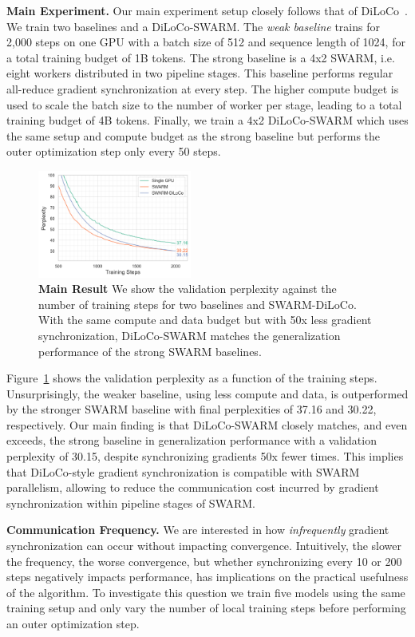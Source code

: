 \documentclass[conference, 10pt]{IEEEtran}
\begin{document}
\textbf{Main Experiment.} Our main experiment setup closely follows that of
DiLoCo~\cite{douillard2023}. We train two baselines and a DiLoCo-SWARM. The
\textit{weak baseline} trains for 2,000 steps on one GPU with a batch size of
512 and sequence length of 1024, for a total training budget of 1B tokens. The 
strong baseline is a 4x2 SWARM, i.e. eight workers distributed in two pipeline 
stages. This baseline performs regular all-reduce gradient synchronization at
every step. The higher compute budget is used to scale the batch size to the
number of worker per stage, leading to a total training budget of 4B tokens.
Finally, we train a 4x2 DiLoCo-SWARM which uses the same setup and compute
budget as the strong baseline but performs the outer optimization step only
every 50 steps.

\begin{figure}[ht]
  \centering
  \includegraphics[width=0.45\textwidth]{figures/experiment1.png}
  \caption{\textbf{Main Result} We show the validation perplexity against the number of training steps for two baselines and SWARM-DiLoCo. With the same compute and
  data budget but with 50x less gradient synchronization, DiLoCo-SWARM matches the 
  generalization performance of the strong SWARM baselines.}
  \label{fig:experiment1}
\end{figure}

Figure~\ref{fig:experiment1} shows the validation perplexity as a function of
the training steps. Unsurprisingly, the weaker baseline, using less compute and
data, is outperformed by the stronger SWARM baseline with final perplexities of 
37.16 and 30.22, respectively. Our main finding is that DiLoCo-SWARM closely
matches, and even exceeds, the strong baseline in generalization performance
with a validation perplexity of 30.15, despite synchronizing gradients 50x fewer
times. This implies that DiLoCo-style gradient synchronization is compatible
with SWARM parallelism, allowing to reduce the communication cost incurred by 
gradient synchronization within pipeline stages of SWARM.

\textbf{Communication Frequency.} We are interested in how \textit{infrequently}
gradient synchronization can occur without impacting convergence. Intuitively,
the slower the frequency, the worse convergence, but whether synchronizing every
10 or 200 steps negatively impacts performance, has implications on the
practical usefulness of the algorithm. To investigate this question we train
five models using the same training setup and only vary the number of local
training steps before performing an outer optimization step.
\end{document}

